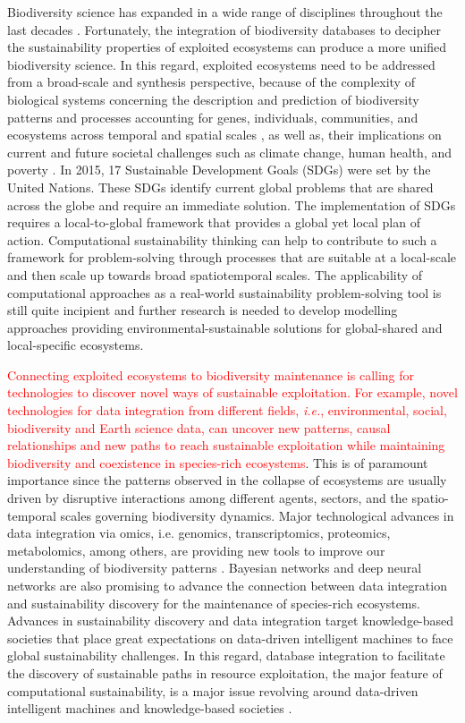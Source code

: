 \documentclass[12pt,a4paper]{article}
\begin{document}
Biodiversity science has expanded in a wide range of disciplines throughout the last decades \citep{loreau2010challenges}. Fortunately, the integration of biodiversity databases to decipher the sustainability properties of exploited ecosystems can produce a more unified biodiversity science. In this regard, exploited ecosystems need to be addressed from a broad-scale and synthesis perspective, because of the complexity of biological systems concerning the description and prediction of biodiversity patterns and processes accounting for genes, individuals, communities, and ecosystems across temporal and spatial scales \citep{chase2018embracing}, as well as, their implications on current and future societal challenges such as climate change, human health, and poverty \citep{cardinale2012biodiversity, turner2012global}. In 2015, 17 Sustainable Development Goals (SDGs) were set by the United Nations. These SDGs identify current global problems that are shared across the globe and require an immediate solution. The implementation of SDGs requires a local-to-global framework that provides a global yet local plan of action. Computational sustainability thinking can help to contribute to such a framework for problem-solving through processes that are suitable at a local-scale and then scale up towards broad spatiotemporal scales. The applicability of computational approaches as a real-world sustainability problem-solving tool is still quite incipient \citep{rabiee2017abstraction} and further research is needed to develop modelling approaches providing environmental-sustainable solutions for global-shared and local-specific ecosystems.

\textcolor{red}{Connecting exploited ecosystems to biodiversity maintenance is calling for technologies to discover novel ways of sustainable exploitation. For example, novel technologies for data integration from different fields, {\it i.e.}, environmental, social, biodiversity and Earth science data, can uncover new patterns, causal relationships and new paths to reach sustainable exploitation while maintaining biodiversity and coexistence in species-rich ecosystems}. This is of paramount importance since the patterns observed in the collapse of ecosystems are usually driven by disruptive interactions among different agents, sectors, and the spatio-temporal scales governing biodiversity dynamics. Major technological advances in data integration via omics, i.e. genomics, transcriptomics, proteomics, metabolomics, among others, are providing new tools to improve our understanding of biodiversity patterns \citep{craven2019evolution}. Bayesian networks and deep neural networks are also promising to advance the connection between data integration and sustainability discovery for the maintenance of species-rich ecosystems. Advances in sustainability discovery and data integration target knowledge-based societies that place great expectations on data-driven intelligent machines to face global sustainability challenges. In this regard, database integration to facilitate the discovery of sustainable paths in resource exploitation, the major feature of computational sustainability, is a major issue revolving around data-driven intelligent machines and knowledge-based societies \citep{Gomesetal2019}. 
\end{document}
